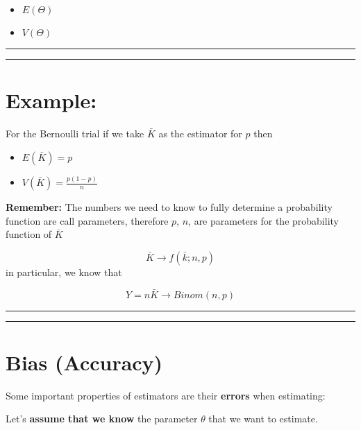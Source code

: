 \documentclass[
]{book}
\providecommand{\tightlist}{%
  \setlength{\itemsep}{0pt}\setlength{\parskip}{0pt}}
\begin{document}
\begin{itemize}
\tightlist
\item
  \(E(\Theta)\)\\
\item
  \(V(\Theta)\)
\end{itemize}

\begin{center}\rule{0.5\linewidth}{0.5pt}\end{center}

\begin{center}\rule{0.5\linewidth}{0.5pt}\end{center}

\hypertarget{example-15}{%
\section{Example:}\label{example-15}}

For the Bernoulli trial if we take \(\bar{K}\) as the estimator for \(p\) then

\begin{itemize}
\tightlist
\item
  \(E(\bar{K})=p\)
\item
  \(V(\bar{K})=\frac{p(1-p)}{n}\)
\end{itemize}

\textbf{Remember:} The numbers we need to know to fully determine a probability function are call parameters, therefore \(p\), \(n\), are parameters for the probability function of \(\bar{K}\)

\[\bar{K} \rightarrow f(\bar{k}; n, p)\]
in particular, we know that

\[Y=n\bar{K} \rightarrow Binom(n, p)\]

\begin{center}\rule{0.5\linewidth}{0.5pt}\end{center}

\begin{center}\rule{0.5\linewidth}{0.5pt}\end{center}

\hypertarget{bias-accuracy}{%
\section{Bias (Accuracy)}\label{bias-accuracy}}

Some important properties of estimators are their \textbf{errors} when estimating:

Let's \textbf{assume that we know} the parameter \(\theta\) that we want to estimate.
\end{document}
